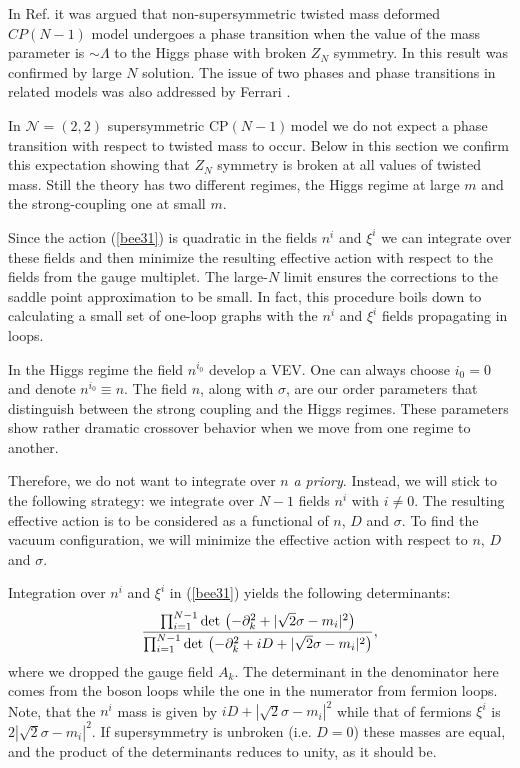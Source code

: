 \documentclass[epsfig,12pt]{article}
\def\beq{\begin{equation}}
\def\eeq{\end{equation}}
\newcommand{\cpn}{CP$(N-1)\,$}
\newcommand{\pt}{\partial}
\def\beq{\begin{equation}}
\def\eeq{\end{equation}}
\newcommand{\ntwot}{${\mathcal N}= \left(2,2\right) $ }
\begin{document}
In Ref. \cite{GSY05}
it was argued that non-supersymmetric twisted mass deformed $CP(N-1)$ model
undergoes a phase transition when the value of the mass parameter is
$\sim \Lambda$ to the Higgs phase with broken $Z_N$ symmetry.
 In \cite{GSYphtr} this result was confirmed by large $N$ solution.
The issue of two phases and phase transitions in related models
was also addressed by Ferrari
\cite{Ferrari,Ferrari2}.

In \ntwot supersymmetric \cpn model we do not expect a phase transition with respect to 
twisted mass to occur. Below in this section we confirm this expectation showing
that $Z_N$ symmetry is  broken at all values of twisted mass. Still the theory has two 
different regimes, the Higgs regime at large $m$ and the  strong-coupling one at small $m$.



Since the action (\ref{bee31}) is quadratic in the fields $n^{i}$ and $\xi^i$
we can integrate over these fields and then minimize the resulting
effective action with respect to the  fields from the gauge multiplet. The large-$N$ limit ensures the corrections to the saddle point approximation to be  small. In fact,
this procedure boils down to calculating a small set of one-loop graphs with the
$n^{i}$ and $\xi^i$  fields propagating in loops.

In the Higgs regime the field $n^{i_0}$ develop a VEV.
One can always choose $i_0=0$ and denote $n^{i_0}\equiv n$. 
The field $n$, along with $\sigma$, are
our order parameters that distinguish between the
strong coupling  and the Higgs regimes. These parameters show rather dramatic crossover behavior
when we move from one regime to another.

Therefore, we do not want
to integrate over $n$ {\em a priory}. Instead,
we will stick to the following strategy:  we integrate over $N-1$
fields $n^{i}$ with $i \ne 0$.
The resulting effective action is to be considered as
a functional of $n$, $D$ and
$\sigma$. To find the vacuum configuration, we will minimize the
effective action with
respect to $n$, $D$ and
$\sigma$.


Integration over $n^{i}$ and $\xi^i$ in (\ref{bee31})
yields the following determinants:
\beq
 \frac{
\prod_{i=1}^{N-1} {\rm det}\, \left(-\pt_{k}^2 
+|\sqrt{2}\sigma-m_i|^2\right)}{
\prod_{i=1}^{N-1}{\rm det}\, \left(-\pt_{k}^2 +iD
+|\sqrt{2}\sigma-m_i|^2\right)},
\label{det}
\eeq
where we dropped the gauge field $A_k$. The  determinant in the denominator here comes from the
boson loops while the one in the numerator from fermion loops. Note, that the $n^{i}$ mass 
 is given by $iD+|\sqrt{2}\sigma-m_i|^2$ while that of fermions $\xi^i$
is $2|\sqrt{2}\sigma-m_i|^2$. If supersymmetry is unbroken (i.e.  $D=0$) these masses are equal,
and the product of the determinants reduces to unity, as
it should be.
\end{document}
